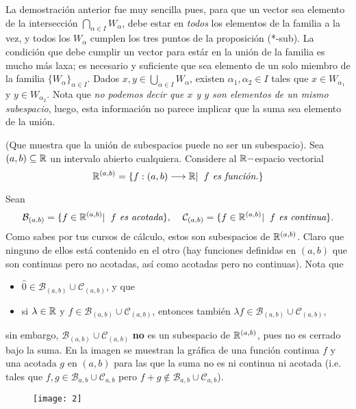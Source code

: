 \QEDB
\vspace{0.2cm}

La demostración anterior fue muy sencilla pues, para
que un vector sea elemento de la intersección
$\bigcap_{\alpha \in I} W_{\alpha}$,
debe estar en \textit{todos} los elementos de la familia a la 
vez, y todos los $W_{\alpha}$ cumplen  
los tres puntos de la proposición (*-sub).
La condición que debe cumplir un vector para estár en la 
unión de la familia es mucho más laxa; es necesario y suficiente
que sea elemento de un solo miembro de la familia
$\{ W_{\alpha} \}_{\alpha \in I}$.
Dados
$x, y \in \bigcup_{\alpha \in I} W_{\alpha}$,
existen $\alpha_{1}, \alpha_{2} \in I$
tales que $x \in W_{\alpha_{1}}$ y 
$y \in W_{\alpha_{2}}$. Nota que \textit{no podemos
decir que $x$ y $y$ son elementos de un mismo subespacio}, luego,
esta información no parece implicar que la suma sea elemento de la 
unión.


\begin{ejem}
	\label{ej: subespacios funciones, dominio abierto}
(Que muestra que la unión de subespacios puede no ser un subespacio).
Sea $(a, b) \subseteq \mathbb{R}$ un intervalo abierto cualquiera.
Considere al $\mathbb{R}-$espacio vectorial
\[
\mathbb{R}^{(a, b)} = \{ f: (a, b) \longrightarrow
\mathbb{R}  | \hspace{0.2cm} f \textit{ es función.} \}
\]

Sean 
\[
\mathcal{B}_{(a, b)} = \{ f \in \mathbb{R}^{(a, b)}  | \hspace{0.2cm}
f \textit{ es acotada}  \}, \hspace{0.4cm}
\mathcal{C}_{(a, b)} = \{ f \in \mathbb{R}^{(a, b)}  | \hspace{0.2cm}
f \textit{ es continua}  \}.
\]
Como sabes por tus cursos de cálculo, estos son subespacios
de $\mathbb{R}^{(a, b)}$. Claro que ninguno de ellos está contenido en el otro
(hay funciones definidas en $(a, b)$ que son continuas pero no acotadas, así
como acotadas pero no continuas).
Nota que 
\begin{itemize}
	\item $\hat{0} \in \mathcal{B}_{(a, b)} \cup \mathcal{C}_{(a, b)}$, y que
	\item si $\lambda \in \mathbb{R}$ y $f \in \mathcal{B}_{(a, b)} \cup \mathcal{C}_{(a, b)}$,
	entonces también $\lambda f \in \mathcal{B}_{(a, b)} \cup \mathcal{C}_{(a, b)}$,
\end{itemize}
sin embargo, $\mathcal{B}_{(a, b)} \cup \mathcal{C}_{(a, b)}$ \textbf{no} es un
subespacio de $\mathbb{R}^{(a, b)}$, pues no es cerrado bajo la suma.
En la imagen se muestran la gráfica
de una función continua $f$ y una acotada
$g$ en $(a, b)$ para las que la suma no es ni continua ni 
acotada (i.e. tales que $f, g \in \mathcal{B}_{a, b} \cup
\mathcal{C}_{a, b}$ pero $f + g \not\in \mathcal{B}_{a, b}
\cup \mathcal{C}_{a, b}$). 
\begin{figure}[H]
	\centering
	\texttt{[image: 2]} 
\end{figure}	
\diam
\end{ejem}

